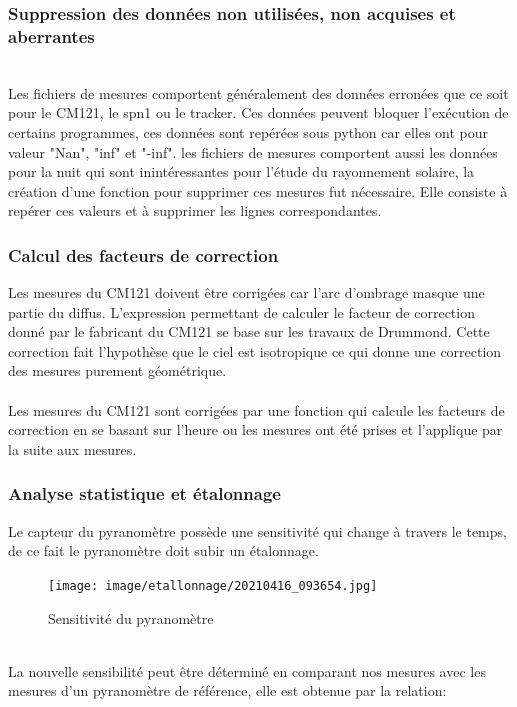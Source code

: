 \documentclass[12pt,a4paper]{article}
\begin{document}
\begin{flushleft}
\subsubsection{Suppression des données non utilisées, non acquises et aberrantes}

~\\
Les fichiers de mesures comportent généralement des données erronées que ce soit pour le CM121, le spn1 ou le tracker. Ces données peuvent bloquer l'exécution de certains programmes, ces données sont repérées sous python car elles ont pour valeur "Nan", "inf" et "-inf". les fichiers de mesures comportent aussi les données pour la nuit qui sont inintéressantes pour l'étude du rayonnement solaire, la création d'une fonction pour supprimer ces mesures fut nécessaire. Elle consiste à repérer ces valeurs et à supprimer les lignes correspondantes.

\subsubsection{Calcul des facteurs de correction}

Les mesures du CM121 doivent être corrigées car l'arc d'ombrage masque une partie du diffus. L'expression permettant de calculer le facteur de correction donné par le fabricant du CM121 se base sur les travaux de Drummond. Cette correction fait l'hypothèse que le ciel est isotropique ce qui donne une correction des mesures purement géométrique.\\
~\\
Les mesures du CM121 sont corrigées par une fonction qui calcule les facteurs de correction en se basant sur l'heure ou les mesures ont été prises et l'applique par la suite aux mesures.

\subsubsection{Analyse statistique et étalonnage}

Le capteur du pyranomètre possède une sensitivité qui change à travers le temps, de ce fait le pyranomètre doit subir un étalonnage. 

\begin{figure}[H]
\centering
\texttt{[image: image/etallonnage/20210416\_093654.jpg]} 
\caption{Sensitivité du pyranomètre}  
\end{figure}
~\\
La nouvelle sensibilité peut être déterminé en comparant nos mesures avec les mesures d'un pyranomètre de référence, elle est obtenue par la relation:


\end{flushleft}
\end{document}
